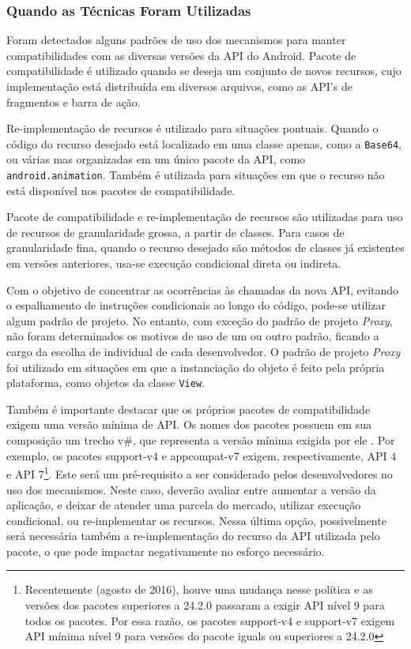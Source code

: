 \subsubsection{Quando as Técnicas Foram Utilizadas}

Foram detectados alguns padrões de uso dos mecanismos para manter compatibilidades com
as diversas versões da API do Android. Pacote de compatibilidade é utilizado quando se
deseja um conjunto de novos recursos, cujo implementação está distribuída em diversos
arquivos, como as API's de fragmentos e barra de ação.

Re-implementação de recursos é utilizado para situações pontuais. Quando o código do
recurso desejado está localizado em uma classe apenas, como a \texttt{Base64},  ou
várias mas organizadas em um único pacote da API, como \texttt{android.animation}.
Também é utilizada para situações em que o recurso não está disponível nos pacotes
de compatibilidade.

Pacote de compatibilidade e re-implementação de recursos são utilizadas para uso de
recursos de granularidade grossa, a partir de classes. Para casos de granularidade
fina, quando o recurso desejado são métodos de classes já existentes em versões
anteriores, usa-se execução condicional direta ou indireta.

Com o objetivo de concentrar as ocorrências às chamadas da nova API, evitando o
espalhamento de instruções condicionais ao longo do código, pode-se utilizar algum
padrão de projeto. No entanto, com exceção do padrão de projeto \textit{Proxy},
não foram determinados os motivos de uso de um ou outro padrão, ficando a cargo da
escolha de individual de cada desenvolvedor. O padrão de projeto \textit{Proxy} foi
utilizado em situações em que a instanciação do objeto é feito pela própria plataforma,
como objetos da classe \texttt{View}.

Também é importante destacar que os próprios pacotes de compatibilidade exigem uma
versão mínima de API. Os nomes dos pacotes possuem em sua composição um trecho v\#,
que representa a versão mínima exigida por ele \cite{SupportLibrary2017}. 
Por exemplo, os pacotes support-v4 e appcompat-v7 exigem, respectivamente, API 4 e
API 7\footnote{Recentemente (agosto de 2016), houve uma mudança nesse política e
as versões dos pacotes superiores a 24.2.0 passaram a exigir API nível 9 para todos
os pacotes. Por essa razão, os pacotes support-v4 e support-v7 exigem API mínima nível
9 para versões do pacote iguals ou superiores a 24.2.0}. Este será um pré-requisito a
ser considerado pelos desenvolvedores no uso dos mecanismos. Neste caso, deverão avaliar
entre aumentar a versão da aplicação, e deixar de atender uma parcela do mercado, utilizar
execução condicional, ou re-implementar os recursos. Nessa última opção, possivelmente será
necessária também a re-implementação do recurso da API utilizada pelo pacote, o que pode
impactar negativamente no esforço necessário.   

